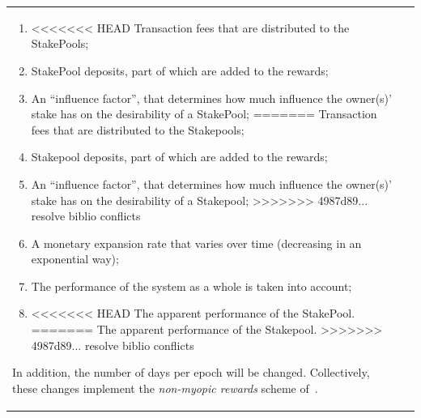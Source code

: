 \documentclass[11pt,a4paper,dvipsnames,twosided,final]{article}
\begin{document}
\begin{tabular}{||l|l||}
\begin{enumerate}
\item
<<<<<<< HEAD
  Transaction fees that are distributed to the StakePools;
\item
  StakePool deposits, part of which are added to the rewards;
\item
  An ``influence factor'', that determines how much influence the owner(s)' stake has on
  the desirability of a StakePool;
=======
  Transaction fees that are distributed to the Stakepools;
\item
  Stakepool deposits, part of which are added to the rewards;
\item
  An ``influence factor'', that determines how much influence the owner(s)' stake has on
  the desirability of a Stakepool;
>>>>>>> 4987d89... resolve biblio conflicts
\item
  A monetary expansion rate that varies over time (decreasing in an exponential way);
\item
  The performance of the system as a whole is taken into account;
\item
<<<<<<< HEAD
  The apparent performance of the StakePool.
=======
  The apparent performance of the Stakepool.
>>>>>>> 4987d89... resolve biblio conflicts
\end{enumerate}

\noindent
In addition, the number of days per epoch will be changed.  Collectively, these changes implement the \emph{non-myopic rewards} scheme of~\cite{delegation_design}.


\end{tabular}
\end{document}
